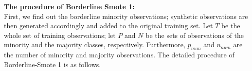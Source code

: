 
\textbf{The procedure of Borderline Smote 1:} \\ 

First, we find out the borderline minority observations; synthetic observations are then generated accordingly and added to the original training set. Let $T$ be the whole set of training observations; let  $P$ and  $N$ be the sets of observations of the minority and the majority classes, respectively. Furthermore, $p_{num}$ and $n_{num}$ are the number of minority and majority observations. The detailed procedure of Borderline-Smote 1 is as follows.

